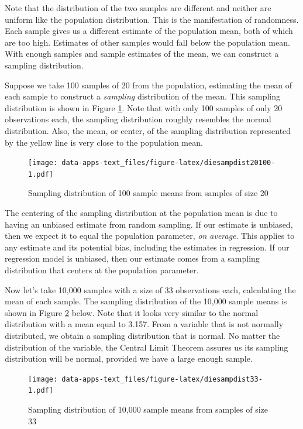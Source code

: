 \documentclass[
]{book}
\begin{document}
Note that the distribution of the two samples are different and neither are uniform like the population distribution. This is the manifestation of randomness. Each sample gives us a different estimate of the population mean, both of which are too high. Estimates of other samples would fall below the population mean. With enough samples and sample estimates of the mean, we can construct a sampling distribution.

Suppose we take 100 samples of 20 from the population, estimating the mean of each sample to construct a \emph{sampling} distribution of the mean. This sampling distribution is shown in Figure \ref{fig:diesampdist20100}. Note that with only 100 samples of only 20 observations each, the sampling distribution roughly resembles the normal distribution. Also, the mean, or center, of the sampling distribution represented by the yellow line is very close to the population mean.

\begin{figure}
\centering
\texttt{[image: data-apps-text\_files/figure-latex/diesampdist20100-1.pdf]}
\caption{\label{fig:diesampdist20100}Sampling distribution of 100 sample means from samples of size 20}
\end{figure}

The centering of the sampling distribution at the population mean is due to having an unbiased estimate from random sampling. If our estimate is unbiased, then we expect it to equal the population parameter, \emph{on average}. This applies to any estimate and its potential bias, including the estimates in regression. If our regression model is unbiased, then our estimate comes from a sampling distribution that centers at the population parameter.

Now let's take 10,000 samples with a size of 33 observations each, calculating the mean of each sample. The sampling distribution of the 10,000 sample means is shown in Figure \ref{fig:diesampdist33} below. Note that it looks very similar to the normal distribution with a mean equal to 3.157. From a variable that is not normally distributed, we obtain a sampling distribution that is normal. No matter the distribution of the variable, the Central Limit Theorem assures us its sampling distribution will be normal, provided we have a large enough sample.

\begin{figure}
\centering
\texttt{[image: data-apps-text\_files/figure-latex/diesampdist33-1.pdf]}
\caption{\label{fig:diesampdist33}Sampling distribution of 10,000 sample means from samples of size 33}
\end{figure}
\end{document}
